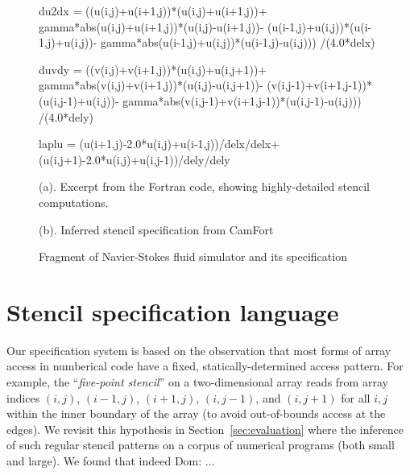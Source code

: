 \documentclass[9pt]{sigplanconf}
\newcommand{\dnote}[1]{\textcolor{darkpurple}{Dom: #1}}
\theoremstyle{definition}
\begin{document}
\begin{figure}
\begin{ExmVerbatim}[firstnumber=20]
du2dx = ((u(i,j)+u(i+1,j))*(u(i,j)+u(i+1,j))+
    gamma*abs(u(i,j)+u(i+1,j))*(u(i,j)-u(i+1,j))-
    (u(i-1,j)+u(i,j))*(u(i-1,j)+u(i,j))-
    gamma*abs(u(i-1,j)+u(i,j))*(u(i-1,j)-u(i,j)))
    /(4.0*delx)

duvdy = ((v(i,j)+v(i+1,j))*(u(i,j)+u(i,j+1))+
   gamma*abs(v(i,j)+v(i+1,j))*(u(i,j)-u(i,j+1))-
   (v(i,j-1)+v(i+1,j-1))*(u(i,j-1)+u(i,j))-
   gamma*abs(v(i,j-1)+v(i+1,j-1))*(u(i,j-1)-u(i,j)))
   /(4.0*dely)

laplu = (u(i+1,j)-2.0*u(i,j)+u(i-1,j))/delx/delx+
          (u(i,j+1)-2.0*u(i,j)+u(i,j-1))/dely/dely
\end{ExmVerbatim}
(a). Excerpt from the Fortran code,
showing highly-detailed stencil computations. \\


\begin{SpecVerbatim}[xleftmargin=0.3cm]

\end{SpecVerbatim}
(b). Inferred stencil specification from CamFort
\caption{Fragment of Navier-Stokes fluid simulator and its specification}
\label{ref:navier-stokes-fragment}
\end{figure}

\section{Stencil specification language}
\label{sec:lang}

Our specification system is based on the observation
that most forms of array access in numberical code have
a fixed, statically-determined access pattern. For example, the
``\emph{five-point stencil}'' on a two-dimensional array reads from array
indices $(i, j)$, $(i-1, j)$, $(i+1, j)$, $(i, j-1)$, and $(i, j+1)$
for all $i, j$ within the inner boundary of the array (to avoid
out-of-bounds access at the edges). We revisit this hypothesis
in Section~\ref{sec:evaluation} where the inference of
such regular stencil patterns on a corpus of numerical programs (both
small and large). We found that indeed \dnote{..}.
\end{document}
